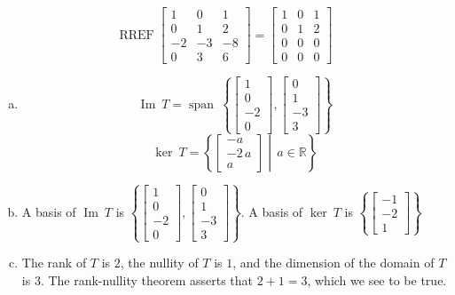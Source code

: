 \begin{exerciseAnswer} 


\[\operatorname{RREF} \left[\begin{array}{ccc}
1 & 0 & 1 \\
0 & 1 & 2 \\
-2 & -3 & -8 \\
0 & 3 & 6
\end{array}\right] = \left[\begin{array}{ccc}
1 & 0 & 1 \\
0 & 1 & 2 \\
0 & 0 & 0 \\
0 & 0 & 0
\end{array}\right] \]


\begin{enumerate}[(a)]
\item \[\operatorname{Im}\ T = \operatorname{span}\  \left\{ \left[\begin{array}{c}
1 \\
0 \\
-2 \\
0
\end{array}\right] , \left[\begin{array}{c}
0 \\
1 \\
-3 \\
3
\end{array}\right] \right\} \]\[\operatorname{ker}\ T =  \left\{ \left[\begin{array}{c}
-a \\
-2 \, a \\
a
\end{array}\right] \middle|\,a\in\mathbb{R}\right\} \]
\item  A basis of \(\operatorname{Im}\ T\) is \( \left\{ \left[\begin{array}{c}
1 \\
0 \\
-2 \\
0
\end{array}\right] , \left[\begin{array}{c}
0 \\
1 \\
-3 \\
3
\end{array}\right] \right\} \). A basis of \(\operatorname{ker}\ T\) is \( \left\{ \left[\begin{array}{c}
-1 \\
-2 \\
1
\end{array}\right] \right\} \)
\item  The rank of \(T\) is \( 2 \), the nullity of \(T\) is \( 1 \), and the dimension of the domain of \(T\) is \( 3 \). The rank-nullity theorem asserts that \( 2 + 1 = 3 \), which we see to be true. 
\end{enumerate}
    
\end{exerciseAnswer}
    
